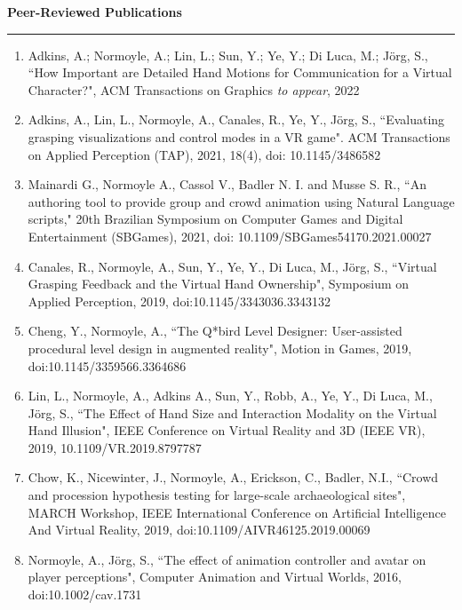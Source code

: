 {\Large {\bf  Peer-Reviewed Publications}}
\vspace{0.1cm}
\hrule
\medskip

\begin{enumerate}[leftmargin=*]

\item Adkins, A.; Normoyle, A.; Lin, L.; Sun, Y.; Ye, Y.; Di Luca, M.; J\"{o}rg, S., ``How Important are Detailed Hand Motions for Communication for a Virtual Character?", ACM Transactions on Graphics \emph{to appear}, 2022

\item Adkins, A., Lin, L., Normoyle, A., Canales, R., Ye, Y., J\"{o}rg, S., ``Evaluating grasping visualizations and control modes in a VR game". ACM Transactions on Applied Perception (TAP), 2021, 18(4), doi: 10.1145/3486582

\item Mainardi G., Normoyle A., Cassol V., Badler N. I. and Musse S. R., ``An authoring tool to provide group and crowd animation using Natural Language scripts," 20th Brazilian Symposium on Computer Games and Digital Entertainment (SBGames), 2021, doi: 10.1109/SBGames54170.2021.00027

\item Canales, R., Normoyle, A., Sun, Y., Ye, Y., Di Luca, M., J\"{o}rg, S., ``Virtual Grasping Feedback and the Virtual Hand Ownership", Symposium on Applied Perception, 2019, doi:10.1145/3343036.3343132

\item Cheng, Y., Normoyle, A., ``The Q*bird Level Designer: User-assisted procedural level design in augmented reality", Motion in Games, 2019, doi:10.1145/3359566.3364686

\item Lin, L., Normoyle, A., Adkins A., Sun, Y., Robb, A., Ye, Y., Di Luca, M., J\"{o}rg, S., ``The Effect of Hand Size and Interaction Modality on the Virtual Hand Illusion", IEEE Conference on Virtual Reality and 3D (IEEE VR), 2019, 10.1109/VR.2019.8797787

\item Chow, K., Nicewinter, J., Normoyle, A., Erickson, C., Badler, N.I., ``Crowd and procession hypothesis testing for large-scale archaeological sites", MARCH Workshop, IEEE International Conference on Artificial Intelligence And Virtual Reality, 2019, doi:10.1109/AIVR46125.2019.00069

\item Normoyle, A., J\"{o}rg, S., ``The effect of animation controller and avatar on player perceptions", 
Computer Animation and Virtual Worlds, 2016, doi:10.1002/cav.1731


\end{enumerate}
